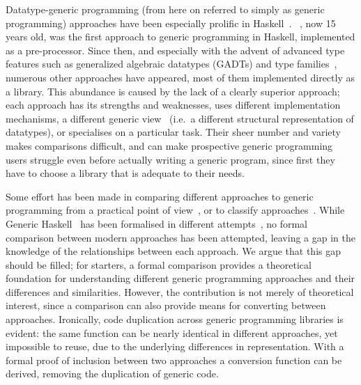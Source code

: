 \documentclass[submission,copyright,creativecommons,sharealike,noncommercial]{eptcs}
\begin{document}
Datatype-generic programming (from here on referred to simply as generic
programming) approaches have been especially prolific in
Haskell~\cite{haskellbook}. \polyp~\cite{polyp}, now 15 years old, was the first
approach to generic programming in Haskell, implemented as a pre-processor.
Since then, and especially with the advent of advanced type features such as
generalized algebraic datatypes (GADTs) and type families~\cite{OutsideIn},
numerous other approaches have appeared, most of them implemented directly as a
library.
This abundance is caused by the lack of a clearly superior approach; each
approach has its strengths and weaknesses, uses different implementation
mechanisms, a different generic view~\cite{GenericViews} (i.e.\ a different
structural representation of datatypes), or specialises on a
particular task. Their sheer number and variety makes comparisons difficult, and
can make prospective generic programming users struggle even before actually
writing a generic program, since first they have to choose a library that is
adequate to their needs.

Some effort has been made in comparing different approaches to generic
programming from a practical point of
view~\cite{UUCS2008010,HinzeJeuringLoh:2007}, or to classify
approaches~\cite{GP3D}.
While Generic Haskell~\cite{exploringGH} has been formalised in different
attempts~\cite{formalGH, arity}, no formal comparison between modern approaches
has been attempted, leaving a gap in the knowledge of the relationships between
each approach. We argue that this gap should be filled; for starters, a formal
comparison provides a theoretical foundation for understanding different generic
programming approaches and their differences and similarities. However, the
contribution is not merely of theoretical interest, since a comparison can also
provide means for converting between approaches. Ironically, code duplication
across generic programming libraries is evident: the same function can be
nearly identical in different approaches, yet impossible to reuse, due to the
underlying differences in representation. With a formal proof of inclusion
between two approaches a conversion function can be derived, removing the
duplication of generic code.
\end{document}
